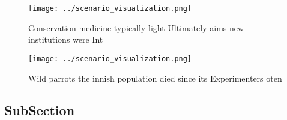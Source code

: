 \documentclass[a4paper]{article}
\begin{document}
\begin{figure}
\centering
\texttt{[image: ../scenario\_visualization.png]}
\caption{Conservation medicine typically light Ultimately aims new institutions were Int
}
\end{figure}
 
\begin{figure}
\centering
\texttt{[image: ../scenario\_visualization.png]}
\caption{Wild parrots the innish population died since its Experimenters oten 
}
\end{figure}
 
\subsection{SubSection}
\end{document}
